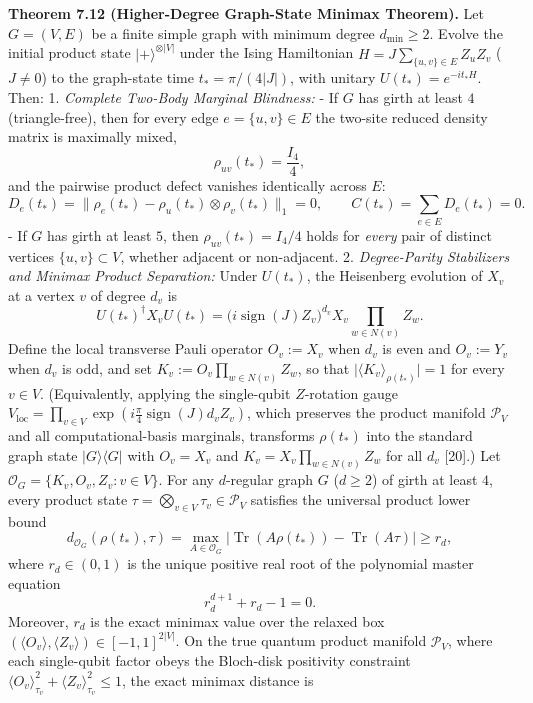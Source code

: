 \documentclass[
  11pt,
]{article}
\begin{document}
\textbf{Theorem 7.12 (Higher-Degree Graph-State Minimax Theorem).} Let \(G=(V,E)\) be a finite simple graph with minimum degree \(d_{\min} \ge 2\). Evolve the initial product state \(|+\rangle^{\otimes |V|}\) under the Ising Hamiltonian \(H = J \sum_{\{u,v\}\in E} Z_u Z_v\) (\(J \ne 0\)) to the graph-state time \(t_* = \pi/(4|J|)\), with unitary \(U(t_*) = e^{-it_* H}\).
Then:
1. \emph{Complete Two-Body Marginal Blindness:}
- If \(G\) has girth at least \(4\) (triangle-free), then for every edge \(e=\{u,v\}\in E\) the two-site reduced density matrix is maximally mixed,
\[
     \rho_{uv}(t_*) = \frac{I_4}{4},
     \]
and the pairwise product defect vanishes identically across \(E\):
\[
     D_e(t_*) = \lVert \rho_e(t_*) - \rho_u(t_*)\otimes\rho_v(t_*)\rVert_1 = 0, \qquad C(t_*) = \sum_{e\in E} D_e(t_*) = 0.
     \]
- If \(G\) has girth at least \(5\), then \(\rho_{uv}(t_*) = I_4/4\) holds for \emph{every} pair of distinct vertices \(\{u,v\} \subset V\), whether adjacent or non-adjacent.
2. \emph{Degree-Parity Stabilizers and Minimax Product Separation:} Under \(U(t_*)\), the Heisenberg evolution of \(X_v\) at a vertex \(v\) of degree \(d_v\) is
\[
   U(t_*)^\dagger X_v U(t_*) = \bigl(i\operatorname{sign}(J) Z_v\bigr)^{d_v} X_v \prod_{w\in N(v)} Z_w.
   \]
Define the local transverse Pauli operator \(O_v := X_v\) when \(d_v\) is even and \(O_v := Y_v\) when \(d_v\) is odd, and set \(K_v := O_v \prod_{w\in N(v)} Z_w\), so that \(\lvert\langle K_v\rangle_{\rho(t_*)}\rvert = 1\) for every \(v\in V\). (Equivalently, applying the single-qubit \(Z\)-rotation gauge \(V_{\mathrm{loc}} = \prod_{v\in V} \exp(i\frac{\pi}{4}\operatorname{sign}(J)d_v Z_v)\), which preserves the product manifold \(\mathcal{P}_V\) and all computational-basis marginals, transforms \(\rho(t_*)\) into the standard graph state \(|G\rangle\langle G|\) with \(O_v = X_v\) and \(K_v = X_v\prod_{w\in N(v)}Z_w\) for all \(d_v\) {[}20{]}.)
Let \(\mathcal{O}_G = \{K_v, O_v, Z_v : v\in V\}\). For any \(d\)-regular graph \(G\) (\(d \ge 2\)) of girth at least \(4\), every product state \(\tau = \bigotimes_{v\in V} \tau_v \in \mathcal{P}_V\) satisfies the universal product lower bound
\[
   d_{\mathcal{O}_G}(\rho(t_*), \tau) = \max_{A\in\mathcal{O}_G} \lvert\operatorname{Tr}(A\rho(t_*)) - \operatorname{Tr}(A\tau)\rvert \ge r_d,
   \]
where \(r_d \in (0,1)\) is the unique positive real root of the polynomial master equation
\[
   r_d^{d+1} + r_d - 1 = 0.
   \]
Moreover, \(r_d\) is the exact minimax value over the relaxed box \((\langle O_v\rangle, \langle Z_v\rangle) \in [-1,1]^{2|V|}\). On the true quantum product manifold \(\mathcal{P}_V\), where each single-qubit factor obeys the Bloch-disk positivity constraint \(\langle O_v\rangle_{\tau_v}^2 + \langle Z_v\rangle_{\tau_v}^2 \le 1\), the exact minimax distance is
\end{document}
